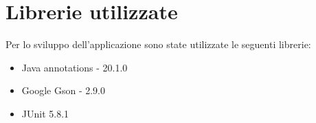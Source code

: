 \section{Librerie utilizzate}

Per lo sviluppo dell'applicazione sono state utilizzate le seguenti librerie:
\begin{itemize}
    \item Java annotations - 20.1.0
    \item Google Gson - 2.9.0
    \item JUnit 5.8.1
\end{itemize}